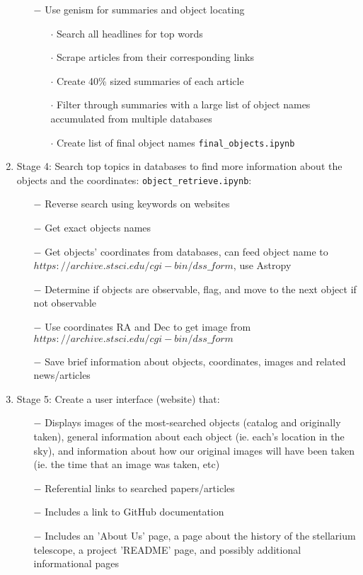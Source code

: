 \documentclass[12pt,letterpaper]{article}
\begin{document}
\begin{enumerate}[leftmargin=*]
        \begin{enumerate}
            \item [$-$] Use genism for summaries and object locating
            \begin{enumerate}[leftmargin=*]
                \item[$\cdot$] Search all headlines for top words
                \item[$\cdot$] Scrape articles from their corresponding links
                \item[$\cdot$] Create 40\% sized summaries of each article 
                \item[$\cdot$] Filter through summaries with a large 
                  list of object names accumulated from multiple databases
                \item[$\cdot$] Create list of final object names \texttt{final\_objects.ipynb}
            \end{enumerate}
        \end{enumerate}
    \item Stage 4: Search top topics in databases to find more information 
    about the objects and the coordinates: \texttt{object\_retrieve.ipynb}:
        \begin{enumerate}
            \item [$-$] Reverse search using keywords on websites
            \item [$-$] Get exact objects names
            \item [$-$] Get objects' coordinates from databases, can feed object 
              name to $https://archive.stsci.edu/cgi-bin/dss\_form$, use Astropy
            \item [$-$] Determine if objects are observable, flag, and move to
              the next object if not observable
            \item [$-$] Use coordinates RA and Dec to get image 
              from $https://archive.stsci.edu/cgi-bin/dss\_form$
            \item [$-$] Save brief information about objects, coordinates, images and 
              related news/articles
        \end{enumerate}
    \item Stage 5: Create a user interface (website) that:
    \begin{enumerate}
        \item [$-$] Displays images of the most-searched objects (catalog and originally taken),
        general information about each object (ie. each's location in the sky), and information about
        how our original images will have been taken (ie. the time that an image was taken, etc)
        \item [$-$] Referential links to searched papers/articles
        \item [$-$] Includes a link to GitHub documentation
        \item [$-$] Includes an 'About Us' page, a page about the history of the stellarium telescope, 
          a project 'README' page, and possibly additional informational pages
    \end{enumerate}
\end{enumerate}
\end{document}
